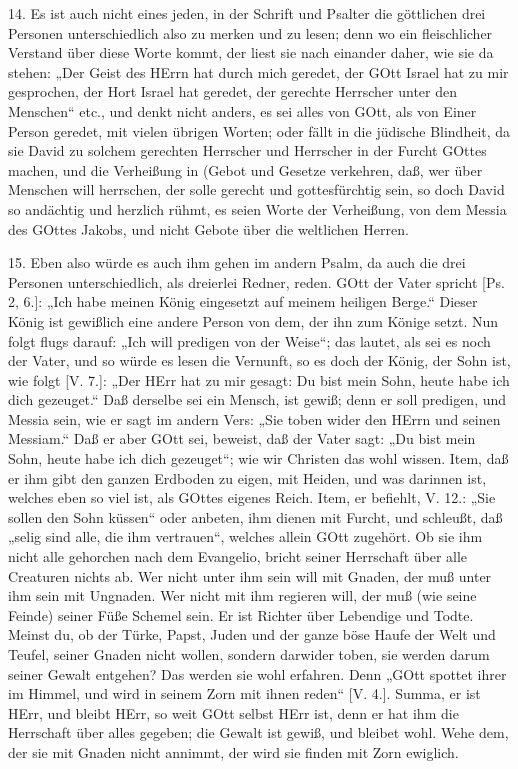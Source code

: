 14. Es ist auch nicht eines jeden, in der Schrift und Psalter die göttlichen drei Personen unterschiedlich also zu merken und zu lesen; denn wo ein fleischlicher Verstand über diese Worte kommt, der liest sie nach einander daher, wie sie da stehen: „Der Geist des HErrn hat durch mich geredet, der GOtt Israel hat zu mir gesprochen, der Hort Israel hat geredet, der gerechte Herrscher unter den Menschen“ etc., und denkt nicht anders, es sei alles von GOtt, als von Einer Person geredet, mit vielen übrigen Worten; oder fällt in die jüdische Blindheit, da sie David zu solchem gerechten Herrscher und Herrscher in der Furcht GOttes machen, und die Verheißung in (Gebot und Gesetze verkehren, daß, wer über Menschen will herrschen, der solle gerecht und gottesfürchtig sein, so doch David so andächtig und herzlich rühmt, es seien Worte der Verheißung, von dem Messia des GOttes Jakobs, und nicht Gebote über die weltlichen Herren.

15. Eben also würde es auch ihm gehen im andern Psalm, da auch die drei Personen unterschiedlich, als dreierlei Redner, reden. GOtt der Vater spricht [Ps. 2, 6.]: „Ich habe meinen König eingesetzt auf meinem heiligen Berge.“ Dieser König ist gewißlich eine andere Person von dem, der ihn zum Könige setzt. Nun folgt flugs darauf: „Ich will predigen von der Weise“; das lautet, als sei es noch der Vater, und so würde es lesen die Vernunft, so es doch der König, der Sohn ist, wie folgt [V. 7.]: „Der HErr hat zu mir gesagt: Du bist mein Sohn, heute habe ich dich gezeuget.“ Daß derselbe sei ein Mensch, ist gewiß; denn er soll predigen, und Messia sein, wie er sagt im andern Vers: „Sie toben wider den HErrn und seinen Messiam.“ Daß er aber GOtt sei, beweist, daß der Vater sagt: „Du bist mein Sohn, heute habe ich dich gezeuget“; wie wir Christen das wohl wissen. Item, daß er ihm gibt den ganzen Erdboden zu eigen, mit Heiden, und was darinnen ist, welches eben so viel ist, als GOttes eigenes Reich. Item, er befiehlt, V. 12.: „Sie sollen den Sohn küssen“ oder anbeten, ihm dienen mit Furcht, und schleußt, daß „selig sind alle, die ihm vertrauen“, welches allein GOtt zugehört. Ob sie ihm nicht alle gehorchen nach dem Evangelio, bricht seiner Herrschaft über alle Creaturen nichts ab. Wer nicht unter ihm sein will mit Gnaden, der muß unter ihm sein mit Ungnaden. Wer nicht mit ihm regieren will, der muß (wie seine Feinde) seiner Füße Schemel sein. Er ist Richter über Lebendige und Todte. Meinst du, ob der Türke, Papst, Juden und der ganze böse Haufe der Welt und Teufel, seiner Gnaden nicht wollen, sondern darwider toben, sie werden darum seiner Gewalt entgehen? Das werden sie wohl erfahren. Denn „GOtt spottet ihrer im Himmel, und wird in seinem Zorn mit ihnen reden“ [V. 4.]. Summa, er ist HErr, und bleibt HErr, so weit GOtt selbst HErr ist, denn er hat ihm die Herrschaft über alles gegeben; die Gewalt ist gewiß, und bleibet wohl. Wehe dem, der sie mit Gnaden nicht annimmt, der wird sie finden mit Zorn ewiglich.

